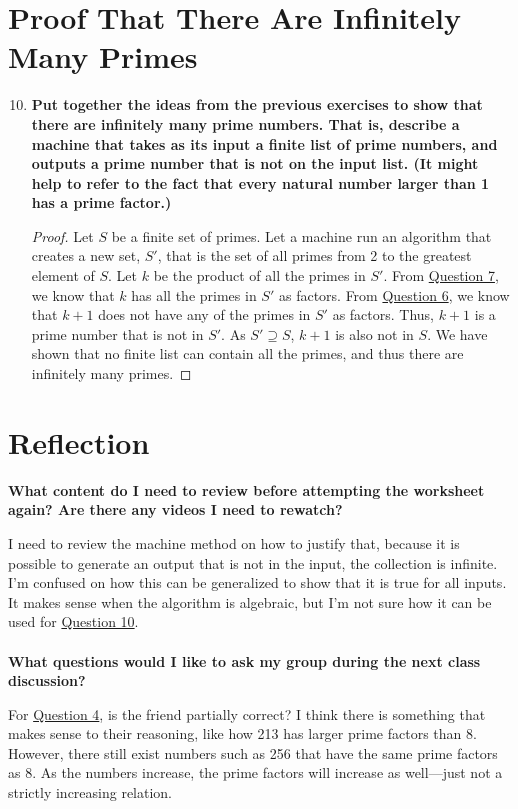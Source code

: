 \documentclass[article, 12pt]{article}
\theoremstyle{definition}
\begin{document}
    \section{Proof That There Are Infinitely Many Primes}
    \begin{enumerate}[(1)]
        \setcounter{enumi}{9}
        \item \textbf{Put together the ideas from the previous exercises to show that there are infinitely many prime numbers. That is, describe a machine that takes as its input a finite list of prime numbers, and outputs a prime number that is not on the input list. (It might help to refer to the fact that every natural number larger than 1 has a prime factor.)}\label{question:prove infinitely many primes}
        \begin{proof}
            Let $S$ be a finite set of primes. Let a machine run an algorithm that creates a new set, $S'$, that is the set of all primes from 2 to the greatest element of $S$. Let $k$ be the product of all the primes in $S'$. From \hyperref[question:produce k]{Question 7}, we know that $k$ has all the primes in $S'$ as factors. From \hyperref[question:k + 1 cannot have n as a factor]{Question 6}, we know that $k+1$ does not have any of the primes in $S'$ as factors. Thus, $k+1$ is a prime number that is not in $S'$. As $S' \supseteq S$, $k+1$ is also not in $S$. We have shown that no finite list can contain all the primes, and thus there are infinitely many primes.
        \end{proof}
    \end{enumerate}
    \section{Reflection}
        \textbf{What content do I need to review before attempting the worksheet again? Are there any videos I need to rewatch?}
        
        I need to review the machine method on how to justify that, because it is possible to generate an output that is not in the input, the collection is infinite. I'm confused on how this can be generalized to show that it is true for all inputs. It makes sense when the algorithm is algebraic, but I'm not sure how it can be used for \hyperref[question:prove infinitely many primes]{Question 10}.
        \\
        \\
        \textbf{What questions would I like to ask my group during the next class discussion?}

        For \hyperref[question:friend]{Question 4}, is the friend partially correct? I think there is something that makes sense to their reasoning, like how 213 has larger prime factors than 8. However, there still exist numbers such as 256 that have the same prime factors as 8. As the numbers increase, the prime factors will increase as well---just not a strictly increasing relation. 
\end{document}
